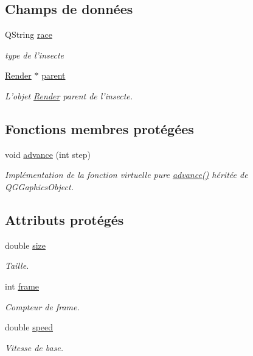 \subsection*{Champs de données}
\begin{DoxyCompactItemize}
\item 
\hypertarget{classBug_a749053e5ac7cc0f6f43c39d99f7b99f8}{
QString \hyperlink{classBug_a749053e5ac7cc0f6f43c39d99f7b99f8}{race}}
\label{classBug_a749053e5ac7cc0f6f43c39d99f7b99f8}

\begin{DoxyCompactList}\small\item\em type de l'insecte \end{DoxyCompactList}\item 
\hyperlink{classRender}{Render} $\ast$ \hyperlink{classBug_a7a93aae4e4b7a215c94ff85d0bd6e26d}{parent}
\begin{DoxyCompactList}\small\item\em L'objet \hyperlink{classRender}{Render} parent de l'insecte. \end{DoxyCompactList}\end{DoxyCompactItemize}
\subsection*{Fonctions membres protégées}
\begin{DoxyCompactItemize}
\item 
void \hyperlink{classBug_a8e0ea03e85c9324a13328da60e5c52ee}{advance} (int step)
\begin{DoxyCompactList}\small\item\em Implémentation de la fonction virtuelle pure \hyperlink{classBug_a8e0ea03e85c9324a13328da60e5c52ee}{advance()} héritée de QGGaphicsObject. \end{DoxyCompactList}\end{DoxyCompactItemize}
\subsection*{Attributs protégés}
\begin{DoxyCompactItemize}
\item 
double \hyperlink{classBug_a27a0f0b84d15525e409955509e6e3c42}{size}
\begin{DoxyCompactList}\small\item\em Taille. \end{DoxyCompactList}\item 
int \hyperlink{classBug_ad7e3597cf049f1051be94fcaf2fd3598}{frame}
\begin{DoxyCompactList}\small\item\em Compteur de frame. \end{DoxyCompactList}\item 
double \hyperlink{classBug_a13b95fbf23748ea853b01bfd0b0e7fc8}{speed}
\begin{DoxyCompactList}\small\item\em Vitesse de base. \end{DoxyCompactList}\end{DoxyCompactItemize}

